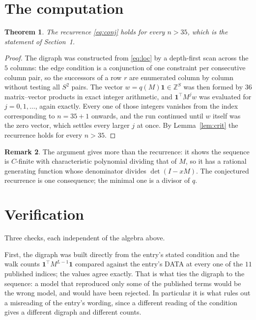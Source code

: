 \documentclass[11pt,a4paper]{article}
\theoremstyle{plain}
\newtheorem{theorem}{Theorem}
\theoremstyle{definition}
\newtheorem{remark}[theorem]{Remark}
\begin{document}
\section{The computation}

\begin{theorem}
The recurrence \eqref{eq:conj} holds for every $n>35$, which is the statement of
Section~1.
\end{theorem}

\begin{proof}
The digraph was constructed from \eqref{eq:loc} by a depth-first scan across the $5$
columns: the edge condition is a conjunction of one constraint per consecutive column
pair, so the successors of a row $r$ are enumerated column by column without testing all
$S^2$ pairs. The vector $w=q(M)\mathbf{1}\in\mathbb{Z}^{S}$ was then formed by $36$
matrix--vector products in exact integer arithmetic, and $\mathbf{1}^{\!\top}M^{j}w$ was
evaluated for $j=0,1,\dots$, again exactly. Every one of those integers vanishes from the
index corresponding to $n=35+1$ onwards, and the run continued until $w$ itself was the
zero vector, which settles every larger $j$ at once. By Lemma~\ref{lem:crit} the recurrence
holds for every $n>35$.
\end{proof}

\begin{remark}
The argument gives more than the recurrence: it shows the sequence is $C$-finite with
characteristic polynomial dividing that of $M$, so it has a rational generating function
whose denominator divides $\det(I-xM)$. The conjectured recurrence is one consequence; the
minimal one is a divisor of $q$.
\end{remark}

\section{Verification}

Three checks, each independent of the algebra above.

First, the digraph was built directly from the entry's stated condition and the walk counts
$\mathbf{1}^{\!\top}M^{L-1}\mathbf{1}$ compared against the entry's DATA at
every one of the $11$ published indices; the values agree exactly. That is what ties
the digraph to the sequence: a model that reproduced only some of the published terms would
be the wrong model, and would have been rejected. In particular it is what rules out a
misreading of the entry's wording, since a different reading of the condition gives a
different digraph and different counts.
\end{document}
